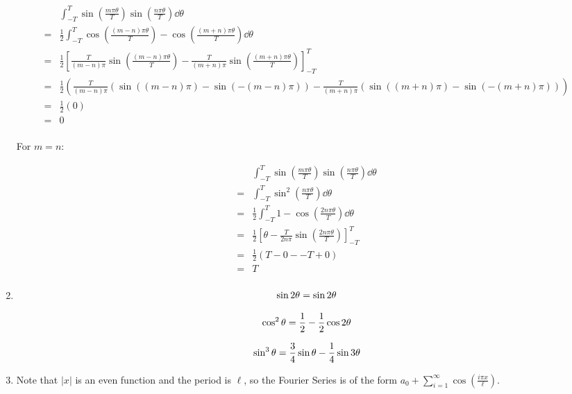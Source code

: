 \documentclass[10pt,\jkfside,a4paper]{article}
\begin{document}
\begin{enumerate}
\[
\begin{split}
 & \int^T_{-T} \sin\left(\frac{m\pi\theta}{T}\right)\sin\left(\frac{n\pi\theta}{T}\right) \dd{\theta} \\
=& \frac{1}{2}\int^T_{-T} \cos\left(\frac{(m - n)\pi\theta}{T}\right) - \cos\left(\frac{(m + n)\pi\theta}{T}\right) \dd{\theta} \\
=& \frac{1}{2}\left[ \frac{T}{(m - n)\pi}\sin\left(\frac{(m - n)\pi\theta}{T}\right) - \frac{T}{(m + n)\pi}\sin\left(\frac{(m + n)\pi\theta}{T}\right) \right]^T_{-T} \\
=& \frac{1}{2}\left( \frac{T}{(m - n)\pi}\left(\sin\left((m - n)\pi\right) - \sin\left(-(m - n)\pi\right)\right) - \frac{T}{(m + n)\pi}\left(\sin\left((m + n)\pi\right) - \sin\left(-(m + n)\pi\right) \right)\right) \\
=& \frac{1}{2}\left( 0 \right) \\
=& 0 \\
\end{split}
\]

For $m = n$:

\[
\begin{split}
 & \int^T_{-T} \sin\left(\frac{m\pi\theta}{T}\right)\sin\left(\frac{n\pi\theta}{T}\right) \dd{\theta} \\
=& \int^T_{-T} \sin^2\left(\frac{n\pi\theta}{T}\right) \dd{\theta} \\
=& \frac{1}{2}\int^T_{-T} 1 - \cos\left(\frac{2n\pi\theta}{T}\right) \dd{\theta} \\
=& \frac{1}{2}\left[ \theta - \frac{T}{2n\pi}\sin\left(\frac{2n\pi\theta}{T}\right) \right]^T_{-T} \\
=& \frac{1}{2}\left(T - 0 - - T + 0\right) \\
=& T \\
\end{split}
\]

\item 

\[
\sin2\theta = \sin2\theta \\
\]

\[
\cos^2\theta = \frac{1}{2} - \frac{1}{2}\cos2\theta \\
\]

\[
\sin^3\theta = \frac{3}{4}\sin\theta - \frac{1}{4}\sin3\theta \\
\]

\item 

Note that $|x|$ is an even function and the period is $\ell$, so the Fourier Series 
is of the form $a_0 + \sum^\infty_{i=1}\cos\left(\frac{i\pi x}{\ell}\right)$.


\end{enumerate}
\end{document}
